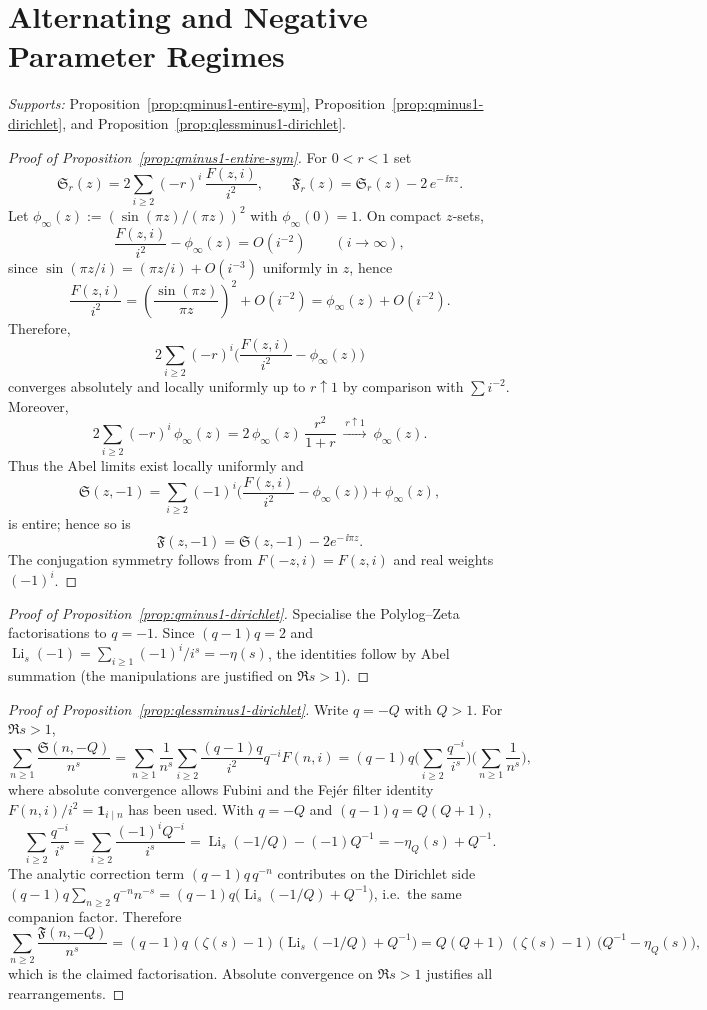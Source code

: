 \section{Alternating and Negative Parameter Regimes}\label{app:q-negative}
\noindent\textit{Supports:} Proposition~\ref{prop:qminus1-entire-sym}, Proposition~\ref{prop:qminus1-dirichlet}, and Proposition~\ref{prop:qlessminus1-dirichlet}.


\begin{proof}[Proof of Proposition~\ref{prop:qminus1-entire-sym}]
For $0<r<1$ set
\[
\mathfrak S_r(z)=2\sum_{i\ge2}(-r)^i\,\frac{F(z,i)}{i^2},\qquad
\mathfrak F_r(z)=\mathfrak S_r(z)-2\,e^{-\,\ii\pi z}.
\]
Let $\phi_\infty(z):=(\sin(\pi z)/(\pi z))^2$ with $\phi_\infty(0)=1$. On compact $z$-sets,
\[
\frac{F(z,i)}{i^2}-\phi_\infty(z)=O(i^{-2})\qquad(i\to\infty),
\]
since $\sin(\pi z/i)=(\pi z/i)+O(i^{-3})$ uniformly in $z$, hence
\[
\frac{F(z,i)}{i^2}=\left(\frac{\sin(\pi z)}{\pi z}\right)^2+O(i^{-2})=\phi_\infty(z)+O(i^{-2}).
\]
Therefore,
\[
2\sum_{i\ge2}(-r)^i\Big(\frac{F(z,i)}{i^2}-\phi_\infty(z)\Big)
\]
converges absolutely and locally uniformly up to $r\uparrow 1$ by comparison with $\sum i^{-2}$. Moreover,
\[
2\sum_{i\ge2}(-r)^i\,\phi_\infty(z)=2\,\phi_\infty(z)\,\frac{r^2}{1+r}\ \xrightarrow{\,r\uparrow1\,}\ \phi_\infty(z).
\]
Thus the Abel limits exist locally uniformly and
\[
\mathfrak S(z,-1)=\sum_{i\ge2}(-1)^i\Big(\frac{F(z,i)}{i^2}-\phi_\infty(z)\Big)+\phi_\infty(z),
\]
is entire; hence so is
\[
\mathfrak F(z,-1)=\mathfrak S(z,-1)-2e^{-\,\ii\pi z}.
\]
The conjugation symmetry follows from $F(-z,i)=F(z,i)$ and real weights $(-1)^i$.
\end{proof}

\begin{proof}[Proof of Proposition~\ref{prop:qminus1-dirichlet}]
Specialise the Polylog--Zeta factorisations to $q=-1$. Since $(q-1)q=2$ and $\operatorname{Li}_s(-1)=\sum_{i\ge1}(-1)^i/i^s=-\eta(s)$, the identities follow by Abel summation (the manipulations are justified on $\Re s>1$).
\end{proof}

\begin{proof}[Proof of Proposition~\ref{prop:qlessminus1-dirichlet}]
Write $q=-Q$ with $Q>1$. For $\Re s>1$,
\[
\sum_{n\ge1}\frac{\mathfrak S(n,-Q)}{n^s}
=\sum_{n\ge1}\frac{1}{n^s}\sum_{i\ge2}\frac{(q-1)q}{i^2}q^{-i}F(n,i)
=(q-1)q\Big(\sum_{i\ge2}\frac{q^{-i}}{i^s}\Big)\Big(\sum_{n\ge1}\frac{1}{n^s}\Big),
\]
where absolute convergence allows Fubini and the Fejér filter identity $F(n,i)/i^2=\mathbf 1_{i\mid n}$ has been used. With $q=-Q$ and $(q-1)q=Q(Q+1)$,
\[
\sum_{i\ge2}\frac{q^{-i}}{i^s}
=\sum_{i\ge2}\frac{(-1)^i Q^{-i}}{i^s}
=\operatorname{Li}_s(-1/Q)-(-1)Q^{-1}
=-\eta_Q(s)+Q^{-1}.
\]
The analytic correction term $(q-1)q\,q^{-n}$ contributes on the Dirichlet side $(q-1)q\sum_{n\ge2}q^{-n}n^{-s}=(q-1)q\bigl(\operatorname{Li}_s(-1/Q)+Q^{-1}\bigr)$, i.e.\ the same companion factor. Therefore
\[
\sum_{n\ge2}\frac{\mathfrak F(n,-Q)}{n^s}
=(q-1)q\,(\zeta(s)-1)\,\bigl(\operatorname{Li}_s(-1/Q)+Q^{-1}\bigr)
=Q(Q+1)\,(\zeta(s)-1)\,\bigl(Q^{-1}-\eta_Q(s)\bigr),
\]
which is the claimed factorisation. Absolute convergence on $\Re s>1$ justifies all rearrangements.
\end{proof}


